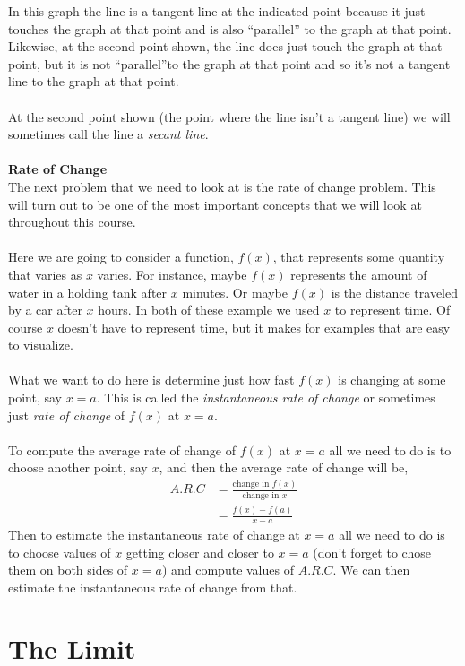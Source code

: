 \documentclass[10pt,reqno]{book}
\begin{document}
	In this graph the line is a tangent line at the indicated point because it just touches the graph at that point and is also ``parallel'' to the graph at that point. Likewise, at the second point shown, the line does just touch the graph at that point, but it is not ``parallel''to the graph at that point and so it's not a tangent line to the graph at that point.\\ \\
	At the second point shown (the point where the line isn't a tangent line) we will sometimes call the line a \textit{secant line}.\\ \\
	\textbf{Rate of Change}\\
	The next problem that we need to look at is the rate of change problem. This will turn out to be one of the most important concepts that we will look at throughout this course.\\ \\
	Here we are going to consider a function, $ f(x) $, that represents some quantity that varies as $ x $ varies. For instance, maybe $ f(x) $ represents the amount of water in a holding tank after $ x $ minutes. Or maybe $ f(x) $ is the distance traveled by a car after $ x $ hours. In both of these example we used $ x $ to represent time. Of course $ x $ doesn't have to represent time, but it makes for examples that are easy to visualize.\\ \\
	What we want to do here is determine just how fast $ f(x) $ is changing at some point, say $ x=a $. This is called the \textit{instantaneous rate of change} or sometimes just \textit{rate of change} of $ f(x) $ at $ x=a $. \\ \\
	To compute the average rate of change of $ f(x) $ at $ x=a $ all we need to do is to choose another point, say $ x $, and then the average rate of change will be,
	\begin{align*}
		A.R.C &= \frac{\text{change in } f(x)}{\text{change in } x}\\
		&= \frac{f(x) - f(a)}{x-a}
	\end{align*}
	Then to estimate the instantaneous rate of change at $ x=a $ all we need to do is to choose values of $ x $ getting closer and closer to $ x=a $ (don't forget to chose them on both sides of $ x=a $) and compute values of $ A.R.C $. We can then estimate the instantaneous rate of change from that.
	
	\section{The Limit}
	
\end{document}
